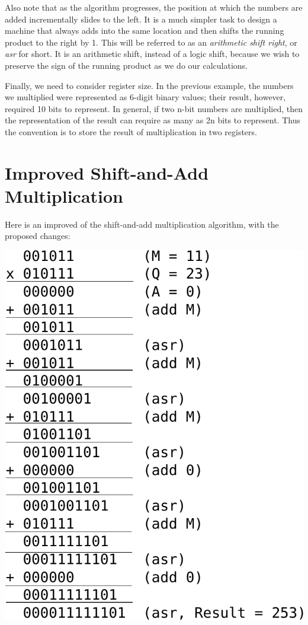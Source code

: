 \documentclass{article}
\begin{document}
Also note that as the algorithm progresses, the position at which the numbers are added incrementally slides to the left.
It is a much simpler task to design a machine that always adds into the same location and then shifts the running product to the right by 1.
This will be referred to as an \emph{arithmetic shift right}, or \emph{asr} for short.
It is an arithmetic shift, instead of a logic shift, because we wish to preserve the sign of the running product as we do our calculations.

Finally, we need to consider register size.
In the previous example, the numbers we multiplied were represented as 6-digit binary values; their result, however, required 10 bits to represent.
In general, if two n-bit numbers are multiplied, then the representation of the result can require as many as 2n bits to represent.
Thus the convention is to store the result of multiplication in two registers.

\section{Improved Shift-and-Add Multiplication}
Here is an improved of the shift-and-add multiplication algorithm, with the proposed changes: %

\includegraphics[scale=0.5]{isaam3.pdf}
\end{document}
